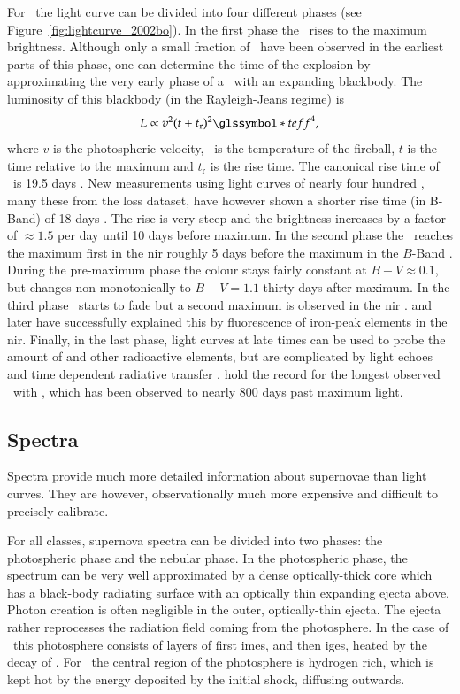For \sneia\ the light curve can be divided into four different phases (see Figure~\ref{fig:lightcurve_2002bo}). In the first phase the \snia\  rises to the maximum brightness. Although only a small fraction of \sneia\ have been observed in the earliest parts of this phase, one can determine the time of the explosion by approximating the very early phase of a \snia\ with an expanding blackbody. The luminosity of this blackbody  (in the Rayleigh-Jeans regime) is 
\[L\propto v^2 (t+t_\textrm{r})^2 \teff^4,\]
where $v$ is the photospheric velocity, \teff\ is the temperature of the fireball, $t$ is the time relative to the maximum and $t_\textrm{r}$ is the rise time. The canonical rise time of \sneia\ is 19.5 days \citep{1999AJ....118.2675R}. New measurements using light curves of nearly four hundred \sneia, many these from the \gls{loss} dataset, have however shown a shorter rise time (in B-Band) of 18 days \citep{2011arXiv1107.2404G}. The rise is very steep and the brightness increases by a factor of $\approx 1.5$ per day until 10 days before maximum. In the second phase the \snia\ reaches the maximum first in the \gls{nir} roughly 5 days before the maximum in the $B$-Band \citep[see Figure~\ref{fig:lightcurve_2002bo};][]{2000MNRAS.314..782M}. During the pre-maximum phase the colour stays fairly constant at $B-V\approx0.1$, but changes non-monotonically to $B-V=1.1$ thirty days after maximum. In the third phase \snia\ starts to fade but a second maximum is observed in the \gls{nir} \citep{2008ApJ...689..377W}. \citet{2000ApJ...530..757P} and later \citet{2006ApJ...649..939K} have successfully explained this by fluorescence of iron-peak elements in the \gls{nir}. Finally, in the last phase, light curves at late times can be used to probe the amount of  and other radioactive elements, but are complicated by light echoes \cite[e.g.][]{1994ApJ...434L..19S} and time dependent radiative transfer \citep{2005A&A...437..983K}. \citet{2009A&A...505..265L} hold the record for the longest observed \sneia\ with , which has been observed to nearly 800 days past maximum light.  

\subsection{Spectra} 
\label{sec:intro_sn_spectra}
Spectra provide much more detailed information about supernovae than light curves. They are however, observationally much more expensive and difficult to precisely calibrate. 

For all classes, supernova spectra can be divided into two phases: the photospheric phase and the nebular phase. In the photospheric phase, the spectrum can be very well approximated by a dense optically-thick core which has a black-body radiating surface with an optically thin expanding ejecta above. Photon creation is often negligible in the outer, optically-thin ejecta. The ejecta rather reprocesses the radiation field coming from the photosphere. In the case of \sneia\ this photosphere consists of layers of first \glspl{ime}, and then \glspl{ige}, heated by the decay of \Ni. For \sneii\ the central region of the photosphere is hydrogen rich, which is kept hot by the energy deposited by the initial shock, diffusing outwards. 

